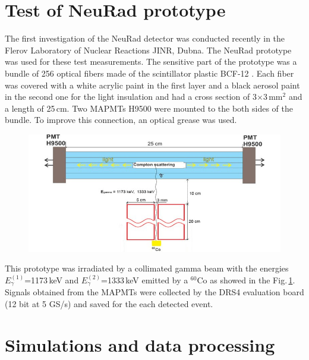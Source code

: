 \documentclass{webofc}
\begin{document}
\section{Test of NeuRad prototype}

The first investigation of the NeuRad detector was conducted recently in the Flerov Laboratory of Nuclear Reactions JINR, Dubna. The NeuRad prototype was used for these test measurements. The sensitive part of the prototype was a bundle of 256 optical fibers made of the scintillator plastic BCF-12 \cite{crystals}. 
Each fiber was covered with a white acrylic paint in the first layer and a black aerosol paint in the second one for the light insulation and had a cross section of 3$\times$3\,mm$^2$ and a length of 25\,cm. Two MAPMTs H9500 \cite{hm} were mounted to the both sides of the bundle. To improve this connection, an optical grease was used.

\begin{figure}[h]
	\centering
	\includegraphics[width=0.66\linewidth]{NeuRadexperiment.png}
\label{ris:neuradexp}
\end{figure}

This prototype was irradiated by a collimated gamma beam with the energies $E^{(1)}_{\gamma}$=1173\,keV and $E^{(2)}_{\gamma}$=1333\,keV emitted by a $^{60}$Co as showed in the Fig.\,\ref{ris:neuradexp}. Signals obtained from the MAPMTs were collected by the DRS4 evaluation board \cite{DRS} (12 bit at 5 GS/s) and saved for the each detected event.

\section{Simulations and data processing}
\end{document}
